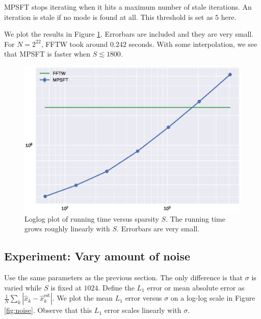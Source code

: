 \documentclass[10pt]{article}
\begin{document}
MPSFT stops iterating when it hits a maximum number of stale iterations. An iteration is stale if no mode is found at all. This threshold is set as $5$ here.

We plot the results in Figure \ref{fig:runtime}. Errorbars are included and they are very small. For $N=2^{22}$, FFTW took around $0.242$ seconds. With some interpolation, we see that MPSFT is faster when $S\lesssim 1800$.


\begin{figure}
\centering
\includegraphics[scale=0.6]{./graph/runtime}
\caption{Loglog plot of running time versus sparsity $S$. The running time grows roughly linearly with $S$. Errorbars are very small. \label{fig:runtime}}
\end{figure}


\subsection{Experiment: Vary amount of noise}

Use the same parameters as the previous section. The only difference is that $\sigma$ is varied while $S$ is fixed at $1024$. Define the $L_1$ error or mean absolute error as $\frac{1}{N}\sum_k |\hat{x}_k - \hat{x}^{\text{est}}_k|$. We plot the mean $L_1$ error versus $\sigma$ on a log-log scale in Figure \ref{fig:noise}. Observe that this $L_1$ error scales linearly with $\sigma$.
\end{document}
